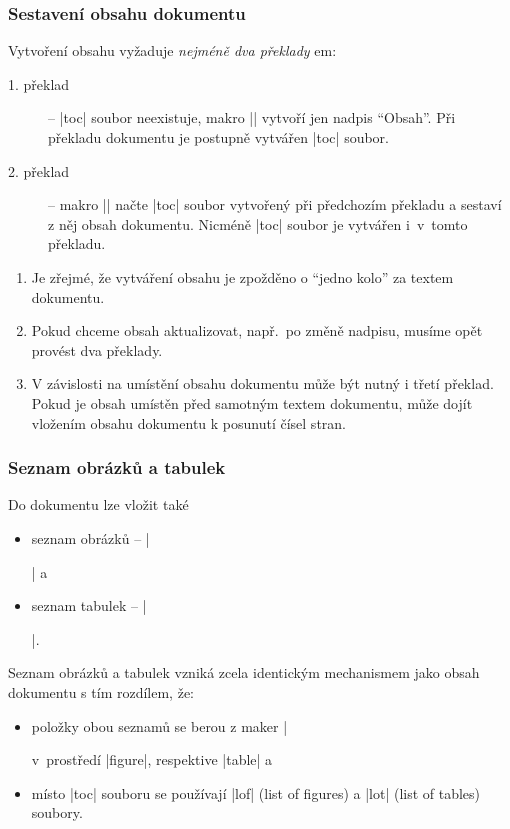 \begin{frame}
	\frametitle{Sestavení obsahu dokumentu}
	Vytvoření obsahu vyžaduje \emph{nejméně dva překlady} em:
	\begin{description}
		\item [1. překlad] -- |toc| soubor neexistuje, makro |\tableofcontents| vytvoří jen nadpis \enquote{Obsah}. Při překladu dokumentu je postupně vytvářen |toc| soubor.
		\item [2. překlad] -- makro |\tableofcontents| načte |toc| soubor vytvořený při předchozím překladu a sestaví z něj obsah dokumentu. Nicméně |toc| soubor je vytvářen i~v~tomto překladu.
	\end{description}
	\begin{remarks}
		\begin{enumerate}
			\item Je zřejmé, že vytváření obsahu je zpožděno o \enquote{jedno kolo} za textem dokumentu.
			\item Pokud chceme obsah aktualizovat, např.\ po změně nadpisu, musíme opět provést dva překlady.
			\item V závislosti na umístění obsahu dokumentu může být nutný i třetí překlad. Pokud je obsah umístěn před samotným textem dokumentu, může dojít vložením obsahu dokumentu k posunutí čísel stran.
		\end{enumerate}
	\end{remarks}
\end{frame}


\begin{frame}
	\frametitle{Seznam obrázků a tabulek}
	Do dokumentu lze vložit také
	\begin{itemize}
		\item seznam obrázků -- |\listoffigures| a
		\item seznam tabulek -- |\listoftables|.
	\end{itemize}
	Seznam obrázků a tabulek vzniká zcela identickým mechanismem jako obsah dokumentu s tím rozdílem, že:
	\begin{itemize}
		\item položky obou seznamů se berou z maker |\caption| v~prostředí |figure|, respektive |table| a
		\item místo |toc| souboru se používají |lof| (list of figures) a |lot| (list of tables) soubory.
	\end{itemize}
\end{frame}


